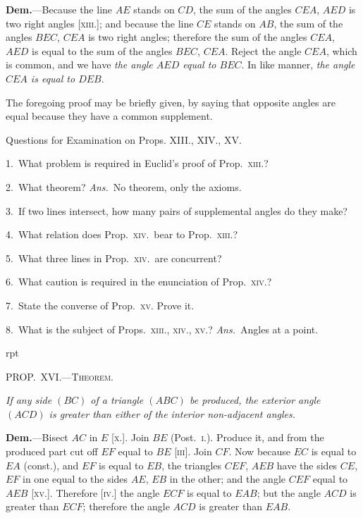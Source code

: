 \documentclass[oneside]{book}
\newcounter{wrapwidth}
\newcommand\mypropflot[5]{
\vspace{0.5\baselineskip}
\bigskip\Needspace*{4\baselineskip}
\setcounter{wrapwidth}{#3}
\begin{wrapfigure}[#4]{r}{\value{wrapwidth}pt}
\begin{center}
\vspace{-0.3in}

\end{center}
\end{wrapfigure}
\hspace{1.5\parindent}\textsc{#1}\par\medskip
\indent\emph{#2}\par\medskip
}
\newcommand\exhead[1]{
\Needspace*{5\baselineskip}\begin{center}
\textsf{#1}
\end{center}
}
\begin{document}
\textbf{Dem.}---Because the line $AE$ stands on $CD$, the sum
of the angles $CEA$, $AED$ is two
right angles [\textsc{xiii}.]; and because
the line $CE$ stands on $AB$,
the sum of the angles $BEC$,
$CEA$ is two right angles; therefore
the sum of the angles $CEA$,
$AED$ is equal to the sum of the
angles $BEC$, $CEA$. Reject the
angle $CEA$, which is common, and we have \textit{the angle
$AED$ equal to $BEC$}. In like manner, \textit{the angle $CEA$
is equal to $DEB$}.

The foregoing proof may be briefly given, by saying
that opposite angles are equal because they have a
common supplement.

\exhead{Questions for Examination on Props. XIII\@., XIV\@., XV\@.}

\begin{footnotesize}
1.~What problem is required in Euclid's proof of Prop.~\textsc{xiii}.?

2.~What theorem? \textit{Ans.}\ No theorem, only the axioms.

3.~If two lines intersect, how many pairs of supplemental
angles do they make?



4.~What relation does Prop.~\textsc{xiv}.~bear to Prop.~\textsc{xiii}.?

5.~What three lines in Prop.~\textsc{xiv}.\ are concurrent?

6.~What caution is required in the enunciation of Prop.~\textsc{xiv}.?

7.~State the converse of Prop.~\textsc{xv}. Prove it.

8.~What is the subject of Props.~\textsc{xiii., xiv., xv.}? \textit{Ans.}\ Angles
at a point.
\par\end{footnotesize}



\mypropflot{PROP\@.~XVI\@.---Theorem.}{If any side $(BC)$ of a triangle $(ABC)$ be produced, the
exterior angle $(ACD)$ is greater than either of the interior\index{Angle!interior}
non-adjacent angles.}{110}{11}{f031}

\textbf{Dem.}---Bisect $AC$ in $E$ [\textsc{x}.]. Join $BE$ (Post.~\textsc{i}.).
Produce it, and from the produced
part cut off $EF$ equal to $BE$ [\textsc{iii}].
Join $CF$. Now because $EC$ is equal
to $EA$ (const.), and $EF$ is equal
to $EB$, the triangles $CEF$, $AEB$
have the sides $CE$, $EF$ in one
equal to the sides $AE$, $EB$ in the
other; and the angle $CEF$ equal
to $AEB$ [\textsc{xv}.]. Therefore [\textsc{iv}.]
the angle $ECF$ is equal to $EAB$;
but the angle $ACD$ is greater
than $ECF$; therefore the angle
$ACD$ is greater than $EAB$.
\end{document}

